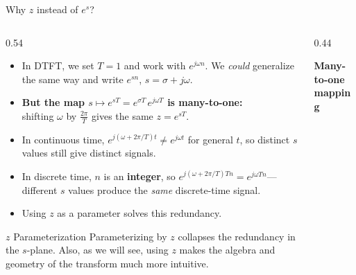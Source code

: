 \begin{frame}[t]{Why $z$ instead of $e^{s}$?}
  \small
  \begin{columns}[T]
    \begin{column}{0.54\textwidth}
      \begin{itemize}
        \item
          In DTFT, we set $T=1$ and work with $e^{j\omega n}$.
          We \emph{could} generalize the same way and write $e^{sn}$, $s = \sigma + j\omega$.
        \item      \textbf{But the map $s\mapsto e^{sT} = e^{\sigma T}\, e^{j\omega T}$ is many-to-one:} \\
          shifting $\omega$ by $\frac{2\pi}{T}$ gives the same $z = e^{sT}$. \\
          \vspace{0.1cm}

        \item
          In continuous time, $e^{j(\omega+2\pi/T)t}\neq e^{j\omega t}$ for general $t$, so distinct $s$ values still give distinct signals.
        \item
          In discrete time,
          $n$ is an \textbf{integer}, so $e^{j(\omega+2\pi/T)Tn} = e^{j\omega T n}$---different $s$ values produce the \emph{same} discrete-time signal.
        \item Using $z$ as a parameter solves this redundancy.

      \end{itemize}

      \begin{insightbox}{$z$ Parameterization}
        Parameterizing by $z$ collapses the redundancy in the $s$-plane. Also,
        as we will see, using $z$ makes the algebra and geometry of the transform much more intuitive.
      \end{insightbox}
    \end{column}
    \begin{column}{0.44\textwidth}
      \begin{center}
        \textbf{Many-to-one mapping}\\[0.15cm]


\end{center}
\end{column}
\end{columns}
\end{frame}
